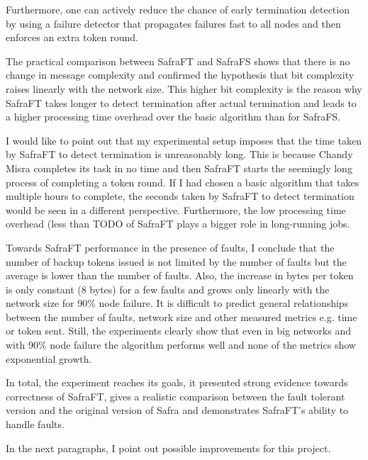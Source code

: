 Furthermore, one can actively reduce the chance of early termination detection by using a failure detector that propagates failures fast to all nodes and then enforces an extra token round.    

The practical comparison between SafraFT and SafraFS shows that there is no change in message complexity and confirmed the hypothesis that bit complexity raises linearly with the network size. 
This higher bit complexity is the reason why SafraFT takes longer to detect termination after actual termination and leads to a higher processing time overhead over the basic algorithm than for SafraFS.

I would like to point out that my experimental setup imposes that the time taken by SafraFT to detect termination is unreasonably long.
This is because Chandy Misra completes its task in no time and then SafraFT starts the seemingly long process of completing a token round.
If I had chosen a basic algorithm that takes multiple hours to complete, the seconds taken by SafraFT to detect termination would be seen in a different perspective.
Furthermore, the low processing time overhead (less than TODO%
of SafraFT plays a bigger role in long-running jobs.

Towards SafraFT performance in the presence of faults, I conclude that the number of backup tokens issued is not limited by the number of faults but the average is lower than the number of faults.
Also, the increase in bytes per token is only constant (8 bytes) for a few faults and grows only linearly with the network size for 90\% node failure.
It is difficult to predict general relationships between the number of faults, network size and other measured metrics e.g. time or token sent.  
Still, the experiments clearly show that even in big networks and with 90\% node failure the algorithm performs well and none of the metrics show exponential growth.

In total, the experiment reaches its goals, it presented strong evidence towards correctness of SafraFT, gives a realistic comparison between the fault tolerant version and the original version of Safra and demonstrates SafraFT's ability to handle faults.

In the next paragraphs, I point out possible improvements for this project.

